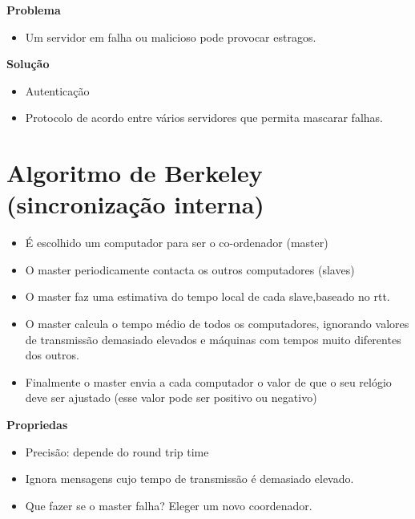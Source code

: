 \documentclass{article}
\begin{document}
\textbf{Problema}

\begin{itemize}
    \item Um servidor em falha ou malicioso pode provocar estragos.

\end{itemize}

\textbf{Solução}
\begin{itemize}
    \item Autenticação 

    \item Protocolo de acordo entre vários servidores que permita mascarar falhas. 
\end{itemize}




\section{Algoritmo de Berkeley  (sincronização interna)}



\begin{itemize}
    \item É escolhido um computador para ser o co-ordenador (master)
    
    \item O master periodicamente contacta os outros computadores (slaves)
    
    \item O master faz uma estimativa do tempo local de cada slave,baseado no rtt.
    
    \item O master calcula o tempo médio de todos os computadores, ignorando valores de transmissão demasiado elevados e máquinas com tempos muito diferentes dos outros.
    
    \item Finalmente o master envia a cada computador o valor de que o seu relógio deve ser ajustado (esse valor pode ser positivo ou negativo)
\end{itemize}

\textbf{Propriedas}

\begin{itemize}
    \item Precisão: depende do round trip time
    \item  Ignora mensagens cujo tempo de transmissão é demasiado elevado.
    \item Que fazer se o master falha? Eleger um novo coordenador. 
\end{itemize}
\end{document}

